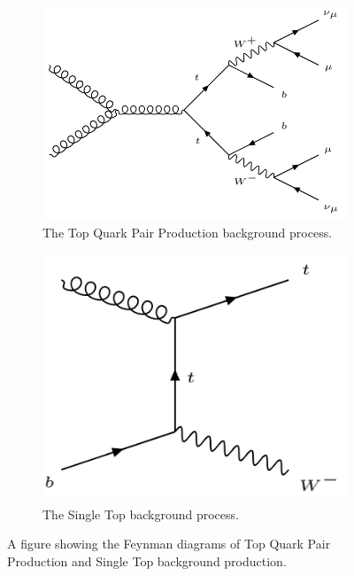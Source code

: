 \documentclass[12pt,a4paper,epsf,portrait,times,epsfig]{article}
\begin{document}
		\begin{figure} [h!]
			\begin{subfigure}{.49\textwidth}
				\centering
				\includegraphics[scale=0.3]{Gluon_ttbar}
				\caption{The Top Quark Pair Production \newline background process.}
				\label{Fig:SFigTtbarFeynman}
			\end{subfigure}
			\begin{subfigure}{.49\textwidth}
				\centering
				\includegraphics[scale=0.4]{Single_Quark}
				\caption{The Single Top background process.}
				\label{Fig:SFigWtFeynman}
			\end{subfigure}
			\caption{A figure showing the Feynman diagrams of Top Quark Pair Production and Single Top background production.}
			\label{Fig:FeynmanBackground1}
		\end{figure}
		
\end{document}
